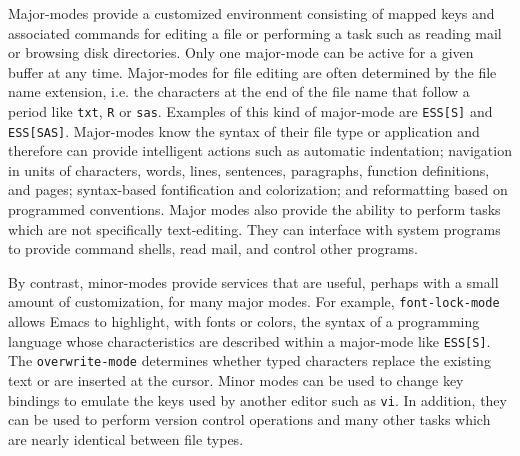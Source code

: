 \documentclass{article}
\newcommand{\stexttt}[1]{{\small\texttt{#1}}}
\newcommand{\ssf}[1]{{\small\sf{#1}}}
\begin{document}
Major-modes provide a customized environment consisting of mapped keys
and associated commands for editing a file or performing a task such
as reading mail or browsing disk directories.
Only one major-mode can be active for a given buffer at any time.
Major-modes for file editing are often determined by the file name
extension, i.e. the characters at the end of the file name that follow
a period like \stexttt{txt}, \stexttt{R} or \stexttt{sas}.  Examples
of this kind of major-mode are \stexttt{ESS[S]} and
\stexttt{ESS[SAS]}.  Major-modes know the syntax of their file type or
application and therefore can provide intelligent actions such as
automatic indentation; navigation in units of characters, words,
lines, sentences, paragraphs, function definitions, and pages;
syntax-based fontification and colorization; and reformatting based on
programmed conventions.
Major modes also provide the ability to perform tasks which are not
specifically text-editing.  They can interface with system programs to
provide command shells, read mail, and control other programs. 

By contrast, minor-modes provide services that are useful, perhaps
with a small amount of customization, for many major modes.  For
example, \stexttt{font-lock-mode} allows Emacs to highlight, with
fonts or colors, the syntax of a programming language whose
characteristics are described within a major-mode like \stexttt{ESS[S]}.
The \stexttt{overwrite-mode}
determines whether typed characters replace the existing text or are
inserted at the cursor.  Minor modes can be used to change key bindings
to emulate the keys used by another editor such as \stexttt{vi}.  In
addition, they can be used to
perform version control operations and many other tasks which are
nearly identical between file types.
\end{document}
